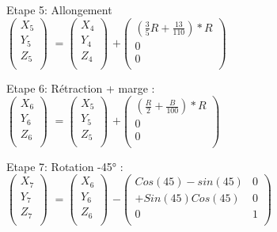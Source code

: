 Etape 5: Allongement \\

$
\begin{pmatrix}
  X_{5} \\
  Y_{5} \\
  Z_{5} \\
\end{pmatrix}
$
\vspace{5mm} %
$
=
\begin{pmatrix}
  X_{4} \\
  Y_{4} \\
  Z_{4} \\
\end{pmatrix}
$
\vspace{5mm} %
$
 +
\begin{pmatrix}
  (\frac{3}{5}R + \frac{13}{110})*R  \\
  0 \\
  0 \\
\end{pmatrix}
$

Etape 6: Rétraction + marge : \\

$
\begin{pmatrix}
  X_{6} \\
  Y_{6} \\
  Z_{6} \\
\end{pmatrix}
$
\vspace{5mm} %
$
=
\begin{pmatrix}
  X_{5} \\
  Y_{5} \\
  Z_{5} \\
\end{pmatrix}
$
\vspace{5mm} %
$
 +
\begin{pmatrix}
  (\frac{R}{2} + \frac{B}{100})*R  \\
  0 \\
  0 \\
\end{pmatrix}
$

Etape 7: Rotation -45° : \\

$
\begin{pmatrix}
  X_{7} \\
  Y_{7} \\
  Z_{7} \\
\end{pmatrix}
$
\vspace{5mm} %
$
=
\begin{pmatrix}
  X_{6} \\
  Y_{6} \\
  Z_{6} \\
\end{pmatrix}
$
\vspace{5mm} %
$
 -
\begin{pmatrix}
  Cos(45)-sin(45) & 0  \\
  +Sin(45)Cos(45) & 0 \\
  0 & 1 \\
\end{pmatrix}
$

